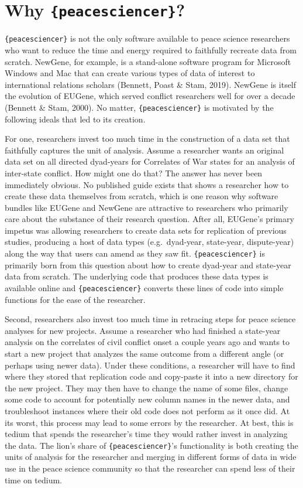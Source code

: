 \documentclass[
  11pt,
]{article}
\begin{document}
\hypertarget{why-peacesciencer}{%
\section{\texorpdfstring{Why \texttt{\{peacesciencer\}}?}{Why \{peacesciencer\}?}}\label{why-peacesciencer}}

\texttt{\{peacesciencer\}} is not the only software available to peace science researchers who want to reduce the time and energy required to faithfully recreate data from scratch. NewGene, for example, is a stand-alone software program for Microsoft Windows and Mac that can create various types of data of interest to international relations scholars (Bennett, Poast \& Stam, 2019). NewGene is itself the evolution of EUGene, which served conflict researchers well for over a decade (Bennett \& Stam, 2000). No matter, \texttt{\{peacesciencer\}} is motivated by the following ideals that led to its creation.

For one, researchers invest too much time in the construction of a data set that faithfully captures the unit of analysis. Assume a researcher wants an original data set on all directed dyad-years for Correlates of War states for an analysis of inter-state conflict. How might one do that? The answer has never been immediately obvious. No published guide exists that shows a researcher how to create these data themselves from scratch, which is one reason why software bundles like EUGene and NewGene are attractive to researchers who primarily care about the substance of their research question. After all, EUGene's primary impetus was allowing researchers to create data sets for replication of previous studies, producing a host of data types (e.g.~dyad-year, state-year, dispute-year) along the way that users can amend as they saw fit. \texttt{\{peacesciencer\}} is primarily born from this question about how to create dyad-year and state-year data from scratch. The underlying code that produces these data types is available online and \texttt{\{peacesciencer\}} converts these lines of code into simple functions for the ease of the researcher.

Second, researchers also invest too much time in retracing steps for peace science analyses for new projects. Assume a researcher who had finished a state-year analysis on the correlates of civil conflict onset a couple years ago and wants to start a new project that analyzes the same outcome from a different angle (or perhaps using newer data). Under these conditions, a researcher will have to find where they stored that replication code and copy-paste it into a new directory for the new project. They may then have to change the name of some files, change some code to account for potentially new column names in the newer data, and troubleshoot instances where their old code does not perform as it once did. At its worst, this process may lead to some errors by the researcher. At best, this is tedium that spends the researcher's time they would rather invest in analyzing the data. The lion's share of \texttt{\{peacesciencer\}}'s functionality is both creating the units of analysis for the researcher and merging in different forms of data in wide use in the peace science community so that the researcher can spend less of their time on tedium.
\end{document}
